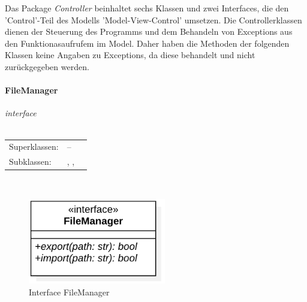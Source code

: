 \documentclass{article}
\newcommand{\classheader}[2][]{\paragraph{#2}
\mbox{}\textit{#1}\\\\}
\newcommand{\classref}[1]{\texttt{\nameref{cls:#1}}}
\begin{document}
Das Package \textit{Controller} beinhaltet sechs Klassen und zwei Interfaces, die den 'Control'-Teil des Modells 'Model-View-Control' umsetzen. Die Controllerklassen dienen der Steuerung des Programms und dem Behandeln von Exceptions aus den Funktionasaufrufem im Model. Daher haben die Methoden der folgenden Klassen keine Angaben zu Exceptions, da diese behandelt und nicht zurückgegeben werden.

\newpage
\classheader[\flqq{}interface\frqq]{FileManager}\label{cls:FileManager}
\begin{tabular}{lll}
 Superklassen: & --\\
 Subklassen: & \classref{ProjectManager} , \classref{FunctionController}, \classref{EvaluationController}
\end{tabular}\\

\begin{figure}[H]%
    \centering
    \includegraphics[width=6cm]{entwurf/Floriane/FileManager.png}
    \caption{Interface FileManager}
\end{figure}
\end{document}
